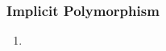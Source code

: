 \documentclass[12pt]{article}	%
\begin{document}
\subsubsection*{Implicit Polymorphism}
\begin{enumerate}
	\item

\end{enumerate}




\end{document}
